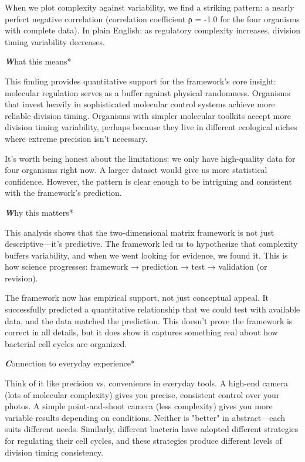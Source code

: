 \documentclass[11pt,a4paper]{article}
\begin{document}
When we plot complexity against variability, we find a striking pattern: a nearly perfect negative correlation (correlation coefficient ρ = -1.0 for the four organisms with complete data). In plain English: as regulatory complexity increases, division timing variability decreases.

\textbf\textit*What this means*

This finding provides quantitative support for the framework's core insight: molecular regulation serves as a buffer against physical randomness. Organisms that invest heavily in sophisticated molecular control systems achieve more reliable division timing. Organisms with simpler molecular toolkits accept more division timing variability, perhaps because they live in different ecological niches where extreme precision isn't necessary.

It's worth being honest about the limitations: we only have high-quality data for four organisms right now. A larger dataset would give us more statistical confidence. However, the pattern is clear enough to be intriguing and consistent with the framework's prediction.

\textbf\textit*Why this matters*

This analysis shows that the two-dimensional matrix framework is not just descriptive—it's predictive. The framework led us to hypothesize that complexity buffers variability, and when we went looking for evidence, we found it. This is how science progresses: framework → prediction → test → validation (or revision).

The framework now has empirical support, not just conceptual appeal. It successfully predicted a quantitative relationship that we could test with available data, and the data matched the prediction. This doesn't prove the framework is correct in all details, but it does show it captures something real about how bacterial cell cycles are organized.

\textbf\textit*Connection to everyday experience*

Think of it like precision vs. convenience in everyday tools. A high-end camera (lots of molecular complexity) gives you precise, consistent control over your photos. A simple point-and-shoot camera (less complexity) gives you more variable results depending on conditions. Neither is "better" in abstract—each suits different needs. Similarly, different bacteria have adopted different strategies for regulating their cell cycles, and these strategies produce different levels of division timing consistency.
\end{document}
